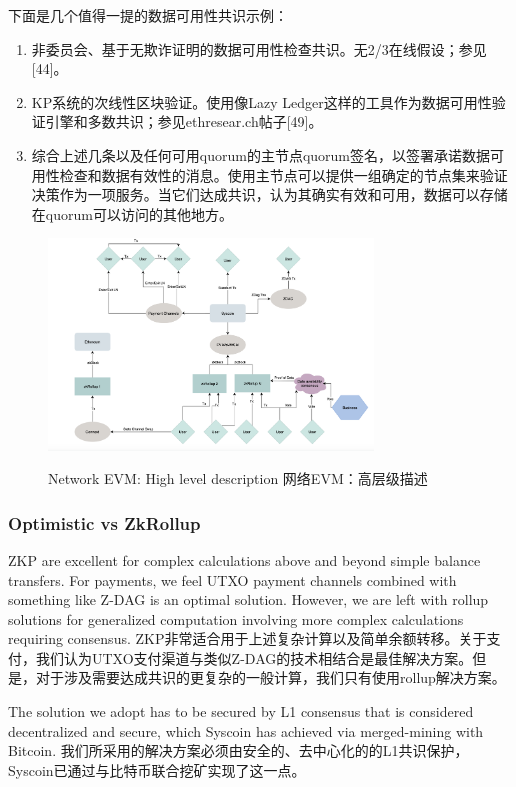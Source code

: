 \documentclass{ctexart}
\begin{document}
下面是几个值得一提的数据可用性共识示例：

\begin{enumerate}
\item 非委员会、基于无欺诈证明的数据可用性检查共识。无2/3在线假设；参见[44]。 
\item KP系统的次线性区块验证。使用像Lazy Ledger这样的工具作为数据可用性验证引擎和多数共识；参见ethresear.ch帖子[49]。
\item 综合上述几条以及任何可用quorum的主节点quorum签名，以签署承诺数据可用性检查和数据有效性的消息。使用主节点可以提供一组确定的节点集来验证决策作为一项服务。当它们达成共识，认为其确实有效和可用，数据可以存储在quorum可以访问的其他地方。
\end{enumerate}


\begin{figure}[h!]
\centering
\includegraphics[width=3.4in]{img/nevm.png}
\label{fig:nevm}
\caption{Network EVM: High level description 网络EVM：高层级描述} 
\end{figure} 

\subsubsection{Optimistic vs ZkRollup}

ZKP are excellent for complex calculations above and beyond simple balance transfers. For payments, we feel UTXO payment channels combined with something like Z-DAG is an optimal solution. However, we are left with rollup solutions for generalized computation involving more complex calculations requiring consensus. ZKP非常适合用于上述复杂计算以及简单余额转移。关于支付，我们认为UTXO支付渠道与类似Z-DAG的技术相结合是最佳解决方案。但是，对于涉及需要达成共识的更复杂的一般计算，我们只有使用rollup解决方案。

The solution we adopt has to be secured by L1 consensus that is considered decentralized and secure, which Syscoin has achieved via merged-mining with Bitcoin. 我们所采用的解决方案必须由安全的、去中心化的的L1共识保护，Syscoin已通过与比特币联合挖矿实现了这一点。
\end{document}
